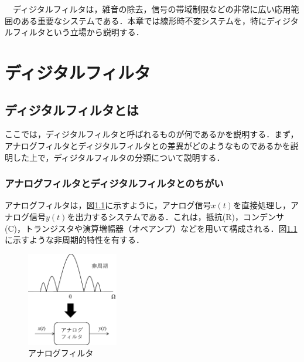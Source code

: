 

\begin{lead}
　ディジタルフィルタは，雑音の除去，信号の帯域制限などの非常に広い応用範囲のある重要なシステムである．本章では線形時不変システムを，特にディジタルフィルタという立場から説明する．

\end{lead}





\chapter{ディジタルフィルタ}
\label{chapter:11}

\section{ディジタルフィルタとは}

ここでは，ディジタルフィルタと呼ばれるものが何であるかを説明する．まず，アナログフィルタとディジタルフィルタとの差異がどのようなものであるかを説明した上で，ディジタルフィルタの分類について説明する．

\subsection{アナログフィルタとディジタルフィルタとのちがい}

アナログフィルタは，図\ref{fig:zu-6-1}に示すように，アナログ信号$x(t)$を直接処理し，アナログ信号$y(t)$を出力するシステムである．これは，抵抗(R)，コンデンサ(C)，トランジスタや演算増幅器（オペアンプ）などを用いて構成される．図\ref{fig:zu-6-1}に示すような非周期的特性を有する．

\begin{figure}[H]
\begin{center}
\includegraphics[width=4cm]{fig/zu-6-1.eps}
\end{center}
\caption{アナログフィルタ}
\label{fig:zu-6-1}
\end{figure}

